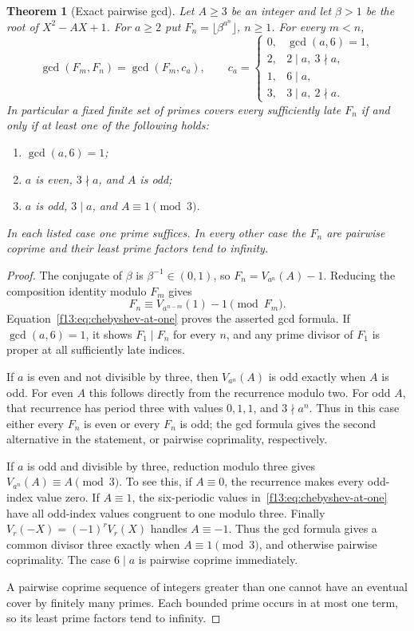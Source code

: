 \documentclass[11pt,a4paper]{article}
\newtheorem{theorem}{Theorem}[section]
\theoremstyle{definition}
\theoremstyle{remark}
\numberwithin{equation}{section}
\begin{document}
\begin{theorem}[Exact pairwise gcd]
\label{f13:thm:quadratic-clock-gcd}
Let $A\ge3$ be an integer and let $\beta>1$ be the root of
$X^2-AX+1$.  For $a\ge2$ put $F_n=\lfloor\beta^{a^n}\rfloor$, $n\ge1$.
For every $m<n$,
\[
 \gcd(F_m,F_n)=\gcd(F_m,c_a),\qquad
 c_a=
 \begin{cases}
 0,&\gcd(a,6)=1,\\
 2,&2\mid a,\ 3\nmid a,\\
 1,&6\mid a,\\
 3,&3\mid a,\ 2\nmid a.
 \end{cases}
\]
In particular a fixed finite set of primes covers every sufficiently late
$F_n$ if and only if at least one of the following holds:
\begin{enumerate}
\item $\gcd(a,6)=1$;
\item $a$ is even, $3\nmid a$, and $A$ is odd;
\item $a$ is odd, $3\mid a$, and $A\equiv1\pmod3$.
\end{enumerate}
In each listed case one prime suffices.  In every other case the
$F_n$ are pairwise coprime and their least prime factors tend to infinity.
\end{theorem}
\begin{proof}
The conjugate of $\beta$ is $\beta^{-1}\in(0,1)$, so
$F_n=V_{a^n}(A)-1$.  Reducing the composition identity modulo $F_m$ gives
\[
 F_n\equiv V_{a^{n-m}}(1)-1\pmod{F_m}.
\]
Equation~\eqref{f13:eq:chebyshev-at-one} proves the asserted gcd formula.
If $\gcd(a,6)=1$, it shows $F_1\mid F_n$ for every $n$, and any prime
divisor of $F_1$ is proper at all sufficiently late indices.

If $a$ is even and not divisible by three, then $V_{a^n}(A)$ is odd
exactly when $A$ is odd.  For even $A$ this follows directly from the
recurrence modulo two.  For odd $A$, that recurrence has period three
with values $0,1,1$, and $3\nmid a^n$.  Thus in this case either every
$F_n$ is even or every $F_n$ is odd; the gcd formula gives the second
alternative in the statement, or pairwise coprimality, respectively.

If $a$ is odd and divisible by three, reduction modulo three gives
$V_{a^n}(A)\equiv A\pmod3$.  To see this, if $A\equiv0$, the
recurrence makes every odd-index value zero.  If $A\equiv1$, the
six-periodic values in~\eqref{f13:eq:chebyshev-at-one} have all odd-index
values congruent to one modulo three.  Finally
$V_r(-X)=(-1)^rV_r(X)$ handles $A\equiv-1$.
Thus the gcd formula gives a common divisor three exactly when
$A\equiv1\pmod3$, and otherwise pairwise coprimality.  The case
$6\mid a$ is pairwise coprime immediately.

A pairwise coprime sequence of integers greater than one cannot have an
eventual cover by finitely many primes.  Each bounded prime occurs in
at most one term, so its least prime factors tend to infinity.
\end{proof}
\end{document}
